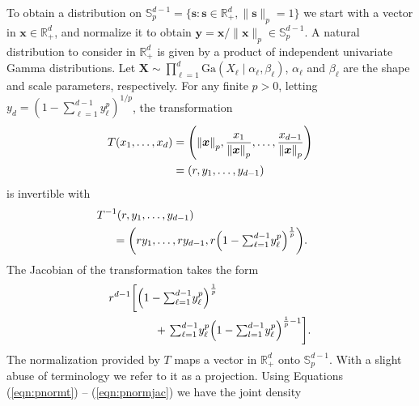 To obtain a distribution on 
${\mathbb S}_{p}^{d-1}=\{\bm{s} : \bm{s} \in {\mathbb R}_{+}^{d}, \| \bm{s}\|_{p} = 1\}$ 
we start with a vector in 
$\bm{x} \in {\mathbb R}^d_+$, and normalize it to obtain 
$\bm{y} = \bm{x}/\|\bm{x}\|_p \in {\mathbb S}_p^{d-1}$. 
A natural  distribution to consider in ${\mathbb R}^d_+$ is given by a product of independent
  univariate Gamma distributions. Let
    $\bm{ X} \sim \prod_{\ell = 1}^d\text{Ga}\left(X_{\ell}\mid\alpha_{\ell},\beta_{\ell}\right)$, 
    $\alpha_\ell$ and $\beta_\ell$ are the shape and scale parameters, respectively. 
    For any finite $p>0$, letting 
   $ y_d = (1 - {\textstyle\sum}_{\ell = 1}^{d-1}y_{\ell}^p)^{1/p}$,
    the transformation
  \begin{equation}
    \label{eqn:pnormt}
    \begin{aligned}
    T(x_1,\ldots,x_d) &= \left(\pnorm{\bm{x}}{p}, \frac{x_1}{\pnorm{\bm{x}}{p}},
                          \ldots , \frac{x_{d-1}}{\pnorm{\bm{x}}{p}}\right) \\
                        &= (r,y_1,\ldots,y_{d-1})
    \end{aligned}
  \end{equation}
  is invertible with
  \begin{equation}
    \label{eqn:pnormtinv}
    \begin{aligned}
    &\hspace{-0.5cm}T^{-1}\left(r,y_1,\ldots,y_{d-1}\right)\\
      & = \left(ry_1,\ldots,ry_{d-1}, 
        r\left(1 - {\textstyle\sum}_{\ell = 1}^{d-1}y_{\ell}^p\right)^{\frac{1}{p}}\right).
    \end{aligned}
  \end{equation}
  The Jacobian of the transformation takes the form
  \begin{equation}
    \label{eqn:pnormjac}
    \begin{aligned}
    r^{d-1}\left[\left(1 - {\textstyle\sum}_{\ell = 1}^{d-1}y_{\ell}^p\right)^{\frac{1}{p}} \right. & \\
        &\hspace{-2cm}+ \left. {\textstyle\sum}_{\ell = 1}^{d-1}y_{\ell}^p
          \left(1 - {\textstyle\sum}_{l=1}^{d-1} y_{\ell}^p\right)^{\frac{1}{p} - 1}\right].
    \end{aligned}
  \end{equation}
  The normalization provided by $T$ maps a vector in ${\mathbb R}_+^d$ onto
  ${\mathbb S}_p^{d-1} $. With a slight abuse of terminology we refer to it as a
  projection. Using Equations (\ref{eqn:pnormt}) -- (\ref{eqn:pnormjac}) we have the joint density
